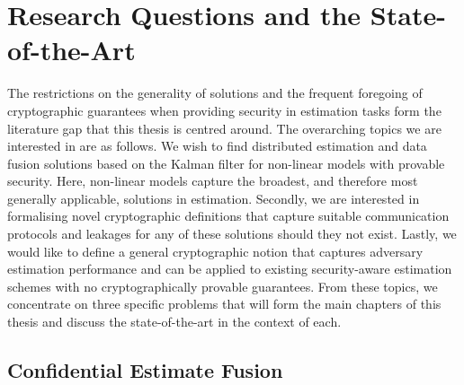 % 
%                                             
%                                             
%                                             
% 

\section{Research Questions and the State-of-the-Art}\label{sec:intro:sota}
The restrictions on the generality of solutions and the frequent foregoing of cryptographic guarantees when providing security in estimation tasks form the literature gap that this thesis is centred around. The overarching topics we are interested in are as follows. We wish to find distributed estimation and data fusion solutions based on the Kalman filter for non-linear models with provable security. Here, non-linear models capture the broadest, and therefore most generally applicable, solutions in estimation. Secondly, we are interested in formalising novel cryptographic definitions that capture suitable communication protocols and leakages for any of these solutions should they not exist. Lastly, we would like to define a general cryptographic notion that captures adversary estimation performance and can be applied to existing security-aware estimation schemes with no cryptographically provable guarantees. From these topics, we concentrate on three specific problems that will form the main chapters of this thesis and discuss the state-of-the-art in the context of each.

% 
% 

\subsection{Confidential Estimate Fusion}\label{subsec:intro:conf_est_fusion}


